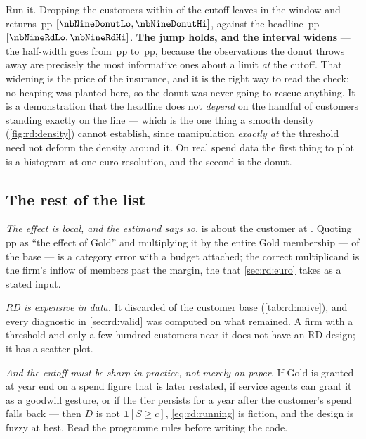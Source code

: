 Run it. Dropping the \nbNineDonutDropped{} customers within \eur{\nbNineDonutEps} of the cutoff leaves
\nbNineDonutN{} in the window and returns \nbNineDonut{}\,pp
$[\nbNineDonutLo, \nbNineDonutHi]$, against the headline \nbNineRd{}\,pp
$[\nbNineRdLo, \nbNineRdHi]$. \textbf{The jump holds, and the interval widens} --- the half-width
goes from \nbNineRdHalf{}\,pp to \nbNineDonutHalf{}\,pp, because the observations the donut throws
away are precisely the most informative ones about a limit \emph{at} the cutoff. That widening is
the price of the insurance, and it is the right way to read the check: no heaping was planted here,
so the donut was never going to rescue anything. It is a demonstration that the headline does not
\emph{depend} on the handful of customers standing exactly on the line --- which is the one thing a
smooth density (\cref{fig:rd:density}) cannot establish, since manipulation \emph{exactly at} the
threshold need not deform the density around it. On real spend data the first thing to plot is a
histogram at one-euro resolution, and the second is the donut.

\subsection*{The rest of the list}

\emph{The effect is local, and the estimand says so.}  is about the customer at
\eur{\nbNineCutoff}. Quoting \nbNineRd{}\,pp as ``the effect of Gold'' and multiplying it by the
entire Gold membership --- \pc{\nbNineGoldShare} of the base --- is a category error with a budget
attached; the correct multiplicand is the firm's inflow of members past the margin, the
\nbNineNMargin{} that \cref{sec:rd:euro} takes as a stated input.

\emph{RD is expensive in data.} It discarded \pc{\nbNineRdDroppedPct} of the customer base
(\cref{tab:rd:naive}), and every diagnostic in \cref{sec:rd:valid} was computed on what remained. A
firm with a threshold and only a few hundred customers near it does not have an RD design; it has a
scatter plot.

\emph{And the cutoff must be sharp in practice, not merely on paper.} If Gold is granted at year end
on a spend figure that is later restated, if service agents can grant it as a goodwill gesture, or
if the tier persists for a year after the customer's spend falls back --- then $D$ is not
$\mathbf 1[S \ge c]$, \cref{eq:rd:running} is fiction, and the design is fuzzy at best. Read the
programme rules before writing the code.

